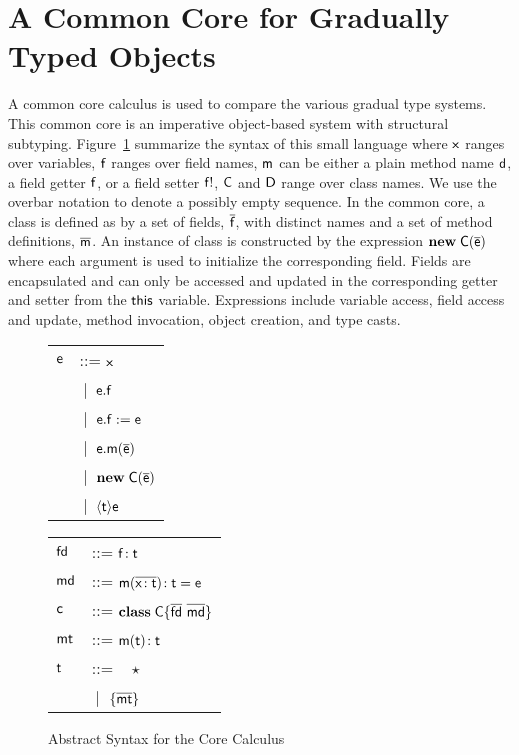 \documentclass[preprint]{sigplanconf}
\newcommand{\fd}{\M{\xt{fd}}}
\newcommand{\md}{\M{\xt{md}}}
\newcommand{\mt}{\M{\xt{mt}}}
\newcommand{\m}{\M{\xt{m}}}
\newcommand{\e}{\M{\xt{e}}}
\renewcommand{\d}{\M{\xt{d}}}
\newcommand{\f}{\M{\xt{f}}}
\newcommand{\fb}{\M{\xt{f!}}}
\newcommand{\x}{\M{\xt{x}}}
\renewcommand{\t}{\M{\xt{t}}}
\renewcommand{\c}{\M{\xt{c}}}
\newcommand{\C}{\M{\xt{C}}}
\newcommand{\D}{\M{\xt{D}}}
\newcommand{\this}{\M{\xt{this}}}
\renewcommand{\d}{\M{\xt{d}}}
\newcommand{\new}{\M{\bt{new}}}
\newcommand{\Get}[2]{\M{#1.#2}}
\newcommand{\Set}[3]{\M{#1.#2:=#3}}
\newcommand{\Call}[3]{\M{#1.#2(#3)}}
\newcommand{\New}[2]{\M{\new\;#1({#2})}}
\newcommand{\Cast}[2]{\M{\langle{#1}\rangle{#2}}}
\newcommand{\any}{\M{\star}}
\newcommand{\Type}[1]{\M{\{ #1 \}}}
\newcommand{\HT}[2]{\M{{#1}\!:{#2}}}
\newcommand{\Mdef}[5]{\M{ \HT { #1( \b{\HT{#2}{#3}})}{#4}={#5}}}
\newcommand{\Ftype}[2]{\M{ \HT{#1}{#2} }}
\newcommand{\Mtype}[3]{\M{ \HT { #1( #2 )}{#3}}}
\newcommand{\Class}[3]{\M{\bt{class}\;#1\{ #2 ~ #3 \}}}
\newcommand{\Alt}[1]{ &\B #1 \\}
\newcommand{\B}{\M{~|~}}
\newcommand{\M}[1]{\ensuremath{#1}\xspace}
\newcommand{\xt}[1]{\sf{#1}}
\newcommand{\bt}[1]{\xt{\bf #1}}
\renewcommand{\b}[1]{\M{\overline{#1}}}
\begin{document}
\newpage

\section{A Common Core for Gradually Typed Objects}



A common core calculus is used to compare the various gradual type
systems. This common core is an imperative object-based system with
structural subtyping. Figure~\ref{syn} summarize the syntax of this small
language where \x ranges over variables, \f ranges over field names, \m can
be either a plain method name \d, a field getter \f, or a field setter \fb,
\C and \D range over class names. We use the overbar notation to denote a
possibly empty sequence. In the common core, a class is defined as by a set
of fields, \b\f, with distinct names and a set of method definitions,
\b\m. An instance of class is constructed by the expression \New\C{\b\e} where
each argument is used to initialize the corresponding field. Fields are
encapsulated and can only be accessed and updated in the corresponding
getter and setter from the \this variable.  Expressions include variable
access, field access and update, method invocation, object creation, and
type casts.



\begin{figure}[!h]\begin{minipage}{3cm}\begin{tabular}{l@{~~~}l}
\e &::=  \x \\
   \Alt{ \Get\e\f }
   \Alt{ \Set\e\f\e }
   \Alt{ \Call\e\m{\b\e} }
   \Alt{ \New\C{\b\e} }
   \Alt{ \Cast\t\e }
\end{tabular}\end{minipage}\begin{minipage}{3cm}\begin{tabular}{l@{~~~}l}
\fd &::= 
    \Ftype\f\t   \\
\md &::=
    \Mdef\m\x\t\t\e \\
\c &::= \Class \C {\b{\fd}}{\b{\md} } \\
\mt &::= \Mtype\m\t\t\\
\t &::= ~ \any \\
   \Alt{ \Type{  \b{ \mt } } }
\end{tabular}\end{minipage}
\caption{Abstract Syntax for the Core Calculus}\label{syn}
\end{figure}
\end{document}
